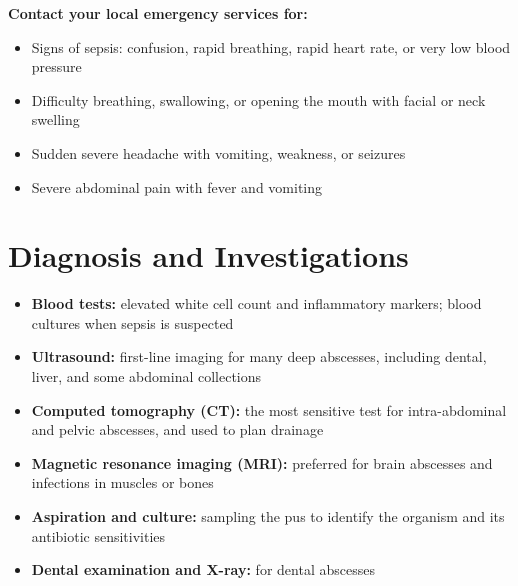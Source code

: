 \textbf{Contact your local emergency services for:}
\begin{itemize}
    \item Signs of sepsis: confusion, rapid breathing, rapid heart rate, or very low blood pressure
    \item Difficulty breathing, swallowing, or opening the mouth with facial or neck swelling
    \item Sudden severe headache with vomiting, weakness, or seizures
    \item Severe abdominal pain with fever and vomiting
\end{itemize}

\section*{Diagnosis and Investigations}
\begin{itemize}
    \item \textbf{Blood tests:} elevated white cell count and inflammatory markers; blood cultures when sepsis is suspected
    \item \textbf{Ultrasound:} first-line imaging for many deep abscesses, including dental, liver, and some abdominal collections
    \item \textbf{Computed tomography (CT):} the most sensitive test for intra-abdominal and pelvic abscesses, and used to plan drainage
    \item \textbf{Magnetic resonance imaging (MRI):} preferred for brain abscesses and infections in muscles or bones
    \item \textbf{Aspiration and culture:} sampling the pus to identify the organism and its antibiotic sensitivities
    \item \textbf{Dental examination and X-ray:} for dental abscesses
\end{itemize}


